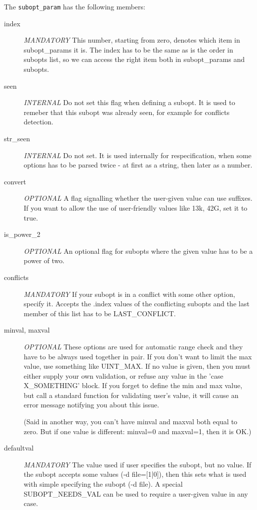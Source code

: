 The {\tt subopt\_param} has the following members:
\begin{description}
\item[index] {\em MANDATORY}
    This number, starting from zero, denotes which item in subopt\_params
    it is. The index has to be the same as is the order in subopts list,
    so we can access the right item both in subopt\_params and subopts.

\item[seen] {\em INTERNAL}
    Do not set this flag when defining a subopt. It is used to remeber that
    this subopt was already seen, for example for conflicts detection.

\item[str\_seen] {\em INTERNAL}
    Do not set. It is used internally for respecification, when some options
    has to be parsed twice - at first as a string, then later as a number.

\item[convert] {\em OPTIONAL}
    A flag signalling whether the user-given value can use suffixes.
    If you want to allow the use of user-friendly values like 13k, 42G,
    set it to true.

\item[is\_power\_2] {\em OPTIONAL}
    An optional flag for subopts where the given value has to be a power
    of two.

\item[conflicts] {\em MANDATORY}
    If your subopt is in a conflict with some other option, specify it.
    Accepts the .index values of the conflicting subopts and the last
    member of this list has to be LAST\_CONFLICT.

\item[minval, maxval] {\em OPTIONAL}
    These options are used for automatic range check and they have to be
    always used together in pair. If you don't want to limit the max value,
    use something like UINT\_MAX. If no value is given, then you must either
    supply your own validation, or refuse any value in the 'case
    X\_SOMETHING' block. If you forget to define the min and max value, but
    call a standard function for validating user's value, it will cause an
    error message notifying you about this issue.

    (Said in another way, you can't have minval and maxval both equal
    to zero. But if one value is different: minval=0 and maxval=1,
    then it is OK.)

\item[defaultval] {\em MANDATORY}
    The value used if user specifies the subopt, but no value.
    If the subopt accepts some values (-d file=[1|0]), then this
    sets what is used with simple specifying the subopt (-d file).
    A special SUBOPT\_NEEDS\_VAL can be used to require a user-given
    value in any case.
		
\end{description}

